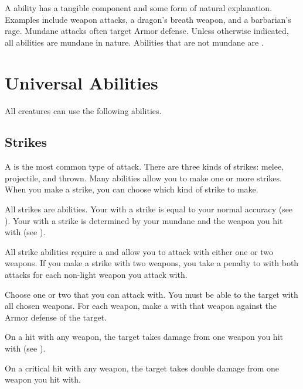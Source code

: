         \label{Mundane Abilities} A  ability has a tangible component and some form of natural explanation.
        Examples include weapon attacks, a dragon's breath weapon, and a barbarian's rage.
        Mundane attacks often target Armor defense.
        Unless otherwise indicated, all abilities are mundane in nature.
        Abilities that are not mundane are .

\section{Universal Abilities}\label{Universal Abilities}
    All creatures can use the following abilities.

    \subsection{Strikes}\label{Strikes}
        A  is the most common type of attack.
        There are three kinds of strikes: melee, projectile, and thrown.
        Many abilities allow you to make one or more strikes.
        When you make a strike, you can choose which kind of strike to make.

        All strikes are  abilities.
        Your  with a strike is equal to your normal accuracy (see ).
        Your  with a strike is determined by your mundane  and the weapon you hit with (see ).

        \label{Two-Weapon Strikes}
        All strike abilities require a  and allow you to attack with either one or two weapons.
        If you make a strike with two weapons, you take a  penalty to  with both attacks for each non-light weapon you attack with.

        \begin{freeability}{}
            Choose one or two  that you can attack with.
            You must be able to  the target with all chosen weapons.
            For each weapon, make a  with that weapon against the Armor defense of the target.

            On a hit with any weapon, the target takes damage from one weapon you hit with (see ).

            On a critical hit with any weapon, the target takes double damage from one weapon you hit with.
        \end{freeability}

